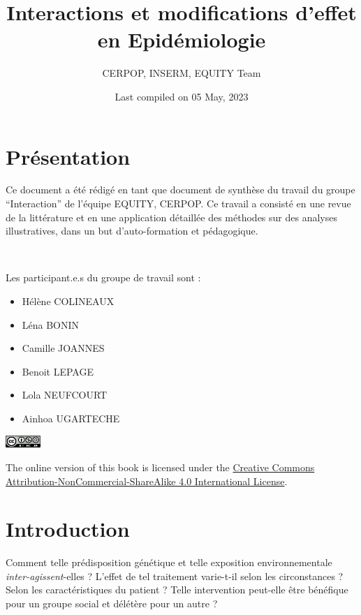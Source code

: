\documentclass[
]{book}
\title{Interactions et modifications d'effet en Epidémiologie}
\author{CERPOP, INSERM, EQUITY Team}
\date{Last compiled on 05 May, 2023}
\providecommand{\tightlist}{%
  \setlength{\itemsep}{0pt}\setlength{\parskip}{0pt}}
\begin{document}
\maketitle

{
\setcounter{tocdepth}{1}
\tableofcontents
}
\hypertarget{pruxe9sentation}{%
\chapter{Présentation}\label{pruxe9sentation}}

Ce document a été rédigé en tant que document de synthèse du travail du groupe ``Interaction'' de l'équipe EQUITY, CERPOP.
Ce travail a consisté en une revue de la littérature et en une application détaillée des méthodes sur des analyses illustratives, dans un but d'auto-formation et pédagogique.

\includegraphics[width=0\textwidth,height=\textheight]{img/Image0.png}

Les participant.e.s du groupe de travail sont :

\begin{itemize}
\tightlist
\item
  Hélène COLINEAUX\\
\item
  Léna BONIN
\item
  Camille JOANNES
\item
  Benoit LEPAGE
\item
  Lola NEUFCOURT
\item
  Ainhoa UGARTECHE
\end{itemize}

\includegraphics[width=0.1\textwidth,height=\textheight]{img/by-nc-sa.png}

The online version of this book is licensed under the \href{https://creativecommons.org/licenses/by-nc-sa/4.0/}{Creative Commons Attribution-NonCommercial-ShareAlike 4.0 International License}.

\hypertarget{introduction}{%
\chapter{Introduction}\label{introduction}}

Comment telle prédisposition génétique et telle exposition environnementale \emph{inter-agissent}-elles ? L'effet de tel traitement varie-t-il selon les circonstances ? Selon les caractéristiques du patient ? Telle intervention peut-elle être bénéfique pour un groupe social et délétère pour un autre ?
\end{document}
